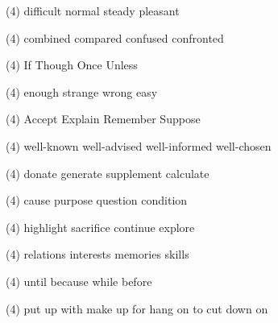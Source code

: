 \item
\begin{tasks}(4)
	\task difficult
	\task normal
	\task steady
	\task pleasant
\end{tasks}
\item
\begin{tasks}(4)
	\task combined
	\task compared
	\task confused
	\task confronted
\end{tasks}
\item
\begin{tasks}(4)
	\task If
	\task Though
	\task Once
	\task Unless
\end{tasks}
\item
\begin{tasks}(4)
	\task enough
	\task strange
	\task wrong
	\task easy
\end{tasks}
\item
\begin{tasks}(4)
	\task Accept
	\task Explain
	\task Remember
	\task Suppose
\end{tasks}
\item
\begin{tasks}(4)
	\task well-known
	\task well-advised
	\task well-informed
	\task well-chosen
\end{tasks}
\item
\begin{tasks}(4)
	\task donate
	\task generate
	\task supplement
	\task calculate
\end{tasks}
\item
\begin{tasks}(4)
	\task cause
	\task purpose
	\task question
	\task condition
\end{tasks}
\item
\begin{tasks}(4)
	\task highlight
	\task sacrifice
	\task continue
	\task explore
\end{tasks}
\item
\begin{tasks}(4)
	\task relations
	\task interests
	\task memories
	\task skills
\end{tasks}
\item
\begin{tasks}(4)
	\task until
	\task because
	\task while
	\task before
\end{tasks}
\item
\begin{tasks}(4)
	\task put up with
	\task make up for
	\task hang on to
	\task cut down on
\end{tasks}
